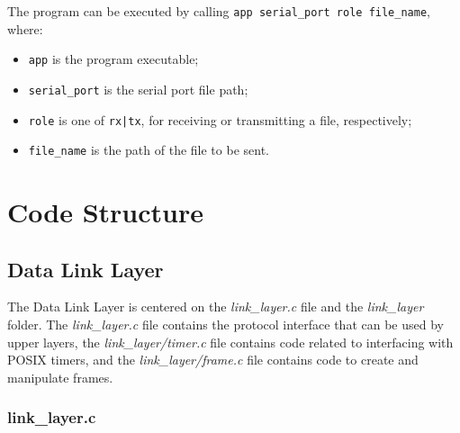 \documentclass[11pt,a4paper]{article}
\begin{document}
The program can be executed by calling \lstinline{app serial_port role file_name}, where:

\begin{itemize}
    \item \lstinline{app} is the program executable;
    \item \lstinline{serial_port} is the serial port file path;
    \item \lstinline{role} is one of \lstinline{rx|tx}, for receiving or transmitting a file, respectively;
    \item \lstinline{file_name} is the path of the file to be sent.
\end{itemize}

\section{Code Structure}

\subsection{Data Link Layer}

The Data Link Layer is centered on the \textit{link\_layer.c} file and the \textit{link\_layer} folder.
The \textit{link\_layer.c} file contains the protocol interface that can be used by upper layers, the \textit{link\_layer/timer.c} file contains code related to interfacing with POSIX timers, and the \textit{link\_layer/frame.c} file contains code to create and manipulate frames.

\subsubsection{link\_layer.c}
\end{document}

